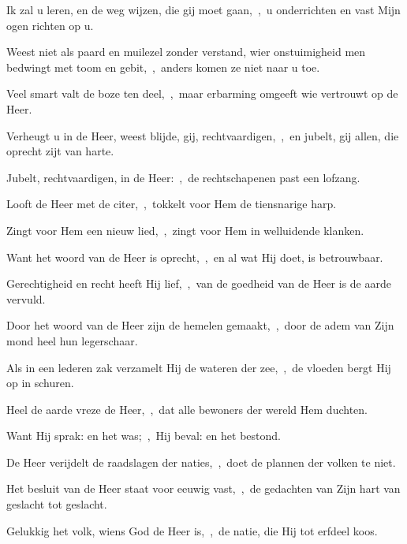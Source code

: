 \documentclass[12pt,twoside,a5paper]{article}
\begin{document}

\begin{halfparskip}
  Ik zal u leren, en de weg wijzen, die gij moet gaan,~\sep\ u onderrichten en vast Mijn ogen richten op u.

  Weest niet als paard en muilezel zonder verstand, wier onstuimigheid men bedwingt met toom en gebit,~\sep\ anders komen ze niet naar u toe.

  Veel smart valt de boze ten deel,~\sep\ maar erbarming omgeeft wie vertrouwt op de Heer.

  Verheugt u in de Heer, weest blijde, gij, rechtvaardigen,~\sep\ en jubelt, gij allen, die oprecht zijt van harte.
\end{halfparskip}





\begin{halfparskip}
  Jubelt, rechtvaardigen, in de Heer:~\sep\ de rechtschapenen past een lofzang.


  Looft de Heer met de citer,~\sep\ tokkelt voor Hem de tiensnarige harp.

  Zingt voor Hem een nieuw lied,~\sep\ zingt voor Hem in welluidende klanken.

  Want het woord van de Heer is oprecht,~\sep\ en al wat Hij doet, is betrouwbaar.

  Gerechtigheid en recht heeft Hij lief,~\sep\ van de goedheid van de Heer is de aarde vervuld.

  Door het woord van de Heer zijn de hemelen gemaakt,~\sep\ door de adem van Zijn mond heel hun legerschaar.

  Als in een lederen zak verzamelt Hij de wateren der zee,~\sep\ de vloeden bergt Hij op in schuren.

  Heel de aarde vreze de Heer,~\sep\ dat alle bewoners der wereld Hem duchten.

  Want Hij sprak: en het was;~\sep\ Hij beval: en het bestond.

  De Heer verijdelt de raadslagen der naties,~\sep\ doet de plannen der volken te niet.

  Het besluit van de Heer staat voor eeuwig vast,~\sep\ de gedachten van Zijn hart van geslacht tot geslacht.

  Gelukkig het volk, wiens God de Heer is,~\sep\ de natie, die Hij tot erfdeel koos.
\end{halfparskip}
\end{document}
